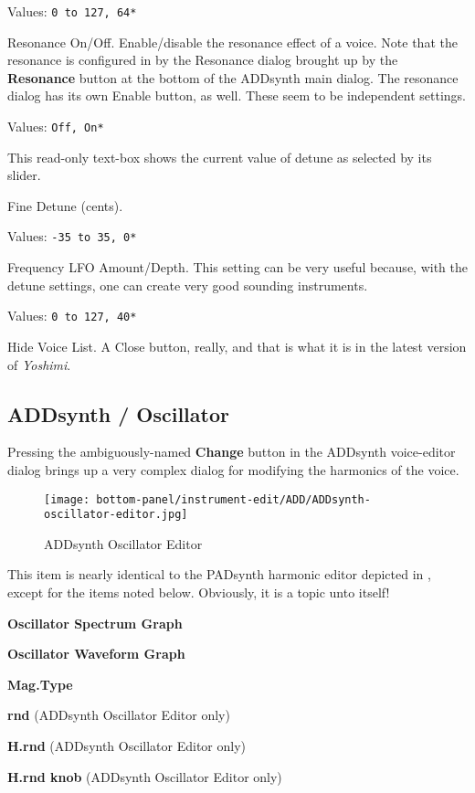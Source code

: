    Values: \texttt{0 to 127, 64*}

   Resonance On/Off.
   Enable/disable the resonance effect of a voice.
   Note that the resonance is configured in by the Resonance dialog brought
   up by the \textbf{Resonance} button at the bottom of the ADDsynth main
   dialog.  The resonance dialog has its own Enable button, as well.
   These seem to be independent settings.

   Values: \texttt{Off, On*}

   This read-only text-box shows the current value of detune as selected by
   its slider.

   Fine Detune (cents).

   Values: \texttt{-35 to 35, 0*}

   Frequency LFO Amount/Depth.
   This setting can be very useful because, with the detune settings, one can
   create very good sounding instruments. 

   Values: \texttt{0 to 127, 40*}

   Hide Voice List.  A Close button, really, and that is what it is in the
   latest version of \textsl{Yoshimi}.

\subsection{ADDsynth / Oscillator}
\label{subsec:addsynth_oscillator}

   Pressing the ambiguously-named \textbf{Change} button in the ADDsynth
   voice-editor dialog brings up a very complex dialog for modifying the
   harmonics of the voice.

\begin{figure}[H]
   \centering 
   \texttt{[image: bottom-panel/instrument-edit/ADD/ADDsynth-oscillator-editor.jpg]}
   \caption{ADDsynth Oscillator Editor}
   \label{fig:addsynth_oscillator_editor}
\end{figure}

   This item is nearly identical to the PADsynth harmonic editor depicted in
   ,
   except for the items noted below.
   Obviously, it is a topic unto itself!

   \begin{enumber}
      \item \textbf{Oscillator Spectrum Graph}
      \item \textbf{Oscillator Waveform Graph}
      \item \textbf{Mag.Type}
      \item \textbf{rnd} (ADDsynth Oscillator Editor only)
      \item \textbf{H.rnd} (ADDsynth Oscillator Editor only)
      \item \textbf{H.rnd knob} (ADDsynth Oscillator Editor only)
   \end{enumber}


